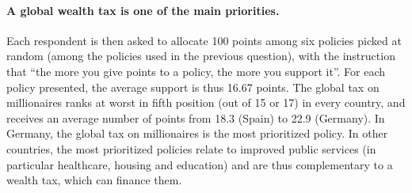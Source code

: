 \documentclass[12pt,english]{article}
\begin{document}


\paragraph{A global wealth tax is one of the main priorities.} Each respondent is then asked to allocate 100 points among six policies picked at random (among the policies used in the previous question), with the instruction that ``the more you give points to a policy, the more you support it''. For each policy presented, the average support is thus 16.67 points.  The global tax on millionaires ranks at worst in fifth position (out of 15 or 17) in every country, and receives an average number of points from 18.3 (Spain) to 22.9 (Germany). 
In Germany, the global tax on millionaires is the most prioritized policy. In other countries, the most prioritized policies relate to improved public services (in particular healthcare, housing and education) and are thus complementary to a wealth tax, which can finance them.
\end{document}
